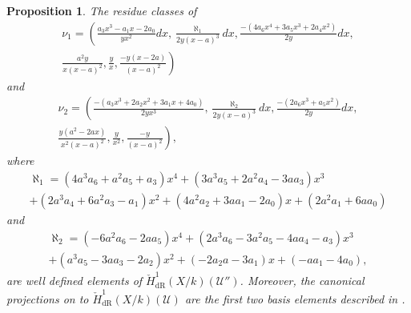 \documentclass[draft, 11pt]{article} %
\theoremstyle{plain}
\newtheorem{prop}[defn]{Proposition}
\theoremstyle{remark}
\newcommand{\cU}{{\mathcal U}}
\newcommand{\cechderhamhone}{\check{H}_{\text {dR}}^1(X/k)}
\begin{document}
\begin{prop}\label{basis22}
The residue classes of
\begin{multline*}
\nu_1 = \left(\frac{a_3x^3-a_1x-2a_0}{yx^2}dx, \frac{\aleph_1}{2y(x-a)^3}dx, \frac{-(4a_6x^4+3a_5x^3+2a_4x^2)}{2y}dx,  \right. \\ \left. \frac{a^2y}{x(x-a)^2}, \frac{y}{x},  \frac{-y(x-2a)}{(x-a)^2} \right)
\end{multline*}
and
\begin{multline*}
\nu_2 = \left( \frac{-(a_3x^3+2a_2x^2+3a_1x+4a_0)}{2yx^3},  \frac{\aleph_2}{2y(x-a)^3}dx, \frac{-(2a_6x^3+a_5x^2)}{2y}dx, \right. \\ \left.  \frac{y(a^2-2ax)}{x^2(x-a)^2},\frac{y}{x^2}, \frac{-y}{(x-a)^2} \right),
\end{multline*}
where
\begin{multline*}
\aleph_1  = (4a^3a_6+a^2a_5+a_3)x^4 + (3a^3a_5+2a^2a_4-3aa_3)x^3 \\
 + (2a^3a_4 + 6a^2a_3 - a_1)x^2 + (4a^2a_2 +3aa_1-2a_0)x+(2a^2a_1+6aa_0)
\end{multline*}
and
\begin{multline*}
\aleph_2  = (-6a^2a_6-2aa_5)x^4 + (2a^3a_6-3a^2a_5-4aa_4-a_3)x^3 \\ + (a^3a_5-3aa_3-2a_2)x^2 + (-2a_2a-3a_1)x +(-aa_1-4a_0),
\end{multline*}
are well defined elements of $\cechderhamhone(\cU'')$.
Moreover, the canonical projections on to $\cechderhamhone(\cU)$ are the first two basis elements described in \cite[Thm. 2.3]{derhamactions}.
\end{prop}
\end{document}
